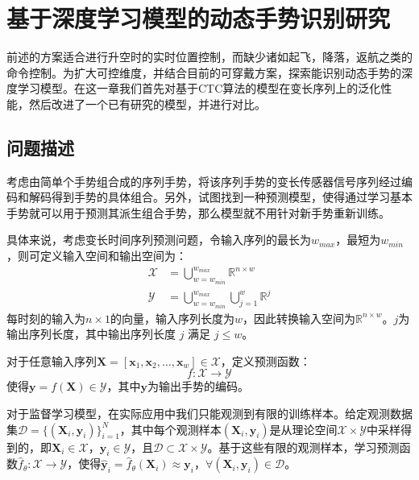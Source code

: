 \ifx\allfiles\undefined


\else
\fi

\section{基于深度学习模型的动态手势识别研究}

前述的方案适合进行升空时的实时位置控制，而缺少诸如起飞，降落，返航之类的命令控制。为扩大可控维度，并结合目前的可穿戴方案，探索能识别动态手势的深度学习模型。在这一章我们首先对基于CTC算法的模型在变长序列上的泛化性能，然后改进了一个已有研究的模型，并进行对比。

\subsection{问题描述}

考虑由简单个手势组合成的序列手势，将该序列手势的变长传感器信号序列经过编码和解码得到手势的具体组合。另外，试图找到一种预测模型，使得通过学习基本手势就可以用于预测其派生组合手势，那么模型就不用针对新手势重新训练。

具体来说，考虑变长时间序列预测问题，令输入序列的最长为$w_{max}$，最短为$w_{min}$，则可定义输入空间和输出空间为：
\begin{align}
\mathcal{X} &= \bigcup_{w=w_{min}}^{w_{max}} \mathbb{R}^{n \times w}\\
\mathcal{Y} &= \bigcup_{w=w_{min}}^{w_{max}} \bigcup_{j=1}^{w} \mathbb{R}^{j}
\end{align}
每时刻的输入为$n\times 1$的向量，输入序列长度为$w$，因此转换输入空间为$\mathbb{R}^{n \times w}$。$j$为输出序列长度，其中输出序列长度 $j$ 满足 $j \leq w$。

对于任意输入序列$\mathbf{X} = [\mathbf{x}_1, \mathbf{x}_2, \ldots, \mathbf{x}_w] \in \mathcal{X}$，定义预测函数：
$$f: \mathcal{X} \rightarrow \mathcal{Y}$$
使得$\mathbf{y} = f(\mathbf{X}) \in \mathcal{Y}$，其中$\mathbf{y}$为输出手势的编码。

对于监督学习模型，在实际应用中我们只能观测到有限的训练样本。给定观测数据集$\mathcal{D} =\{(\mathbf{X}_i, \mathbf{y}_i)\}_{i=1}^N$，其中每个观测样本$(\mathbf{X}_i, \mathbf{y}_i)$是从理论空间$\mathcal{X} \times \mathcal{Y}$中采样得到的，即$\mathbf{X}_i \in \mathcal{X}$，$\mathbf{y}_i \in \mathcal{Y}$，且$\mathcal{D} \subset \mathcal{X} \times \mathcal{Y}$。基于这些有限的观测样本，学习预测函数$\hat{f}_\theta: \mathcal{X} \rightarrow \mathcal{Y}$，使得$\hat{\mathbf{y}}_i=\hat{f}_\theta(\mathbf{X}_i)\approx\mathbf{y}_i$，$\forall (\mathbf{X}_i, \mathbf{y}_i) \in \mathcal{D}$。


